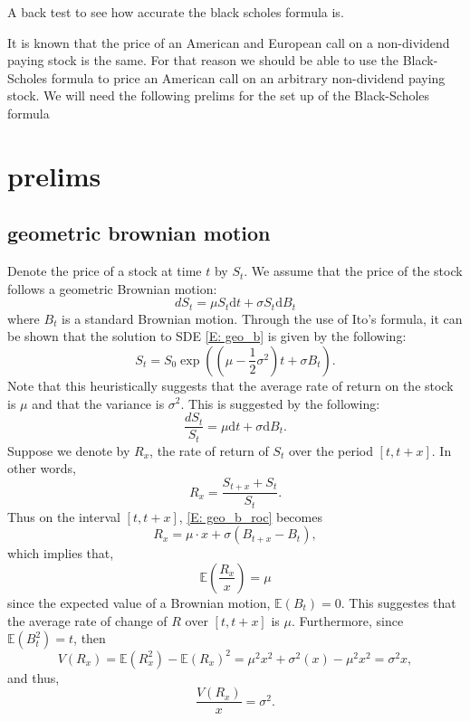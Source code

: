 \documentclass{article}
\numberwithin{equation}{section}
\newcommand{\ud}{\ensuremath{\mathrm{d}}}
\begin{document}
\begin{center}
	A back test to see how accurate the black scholes formula is.
\end{center}

It is known that the price of an American and European call on a non-dividend paying stock is the same. For that reason we should be able to use the Black-Scholes formula to price an American call on an arbitrary non-dividend paying stock. We will need the following prelims for the set up of the Black-Scholes formula 

\section{prelims}
\subsection{geometric brownian motion}
Denote the  price of a stock at time $t$ by $S_t$. We assume that the price of the stock follows a geometric Brownian motion:
	\begin{equation} \label{E: geo_b}
		dS_t = \mu S_t \ud t + \sigma S_t \ud B_t
	\end{equation}
where $B_t$ is a standard Brownian motion. Through the use of Ito's formula, it can be shown that the solution to SDE \eqref{E: geo_b} is given by the following:
	\begin{equation} \label{E: geo_b_sol}
		S_t = S_0 \exp\left( \left( \mu - \frac{1}{2}\sigma^2 \right)t + \sigma B_t \right).
	\end{equation} 
Note that this heuristically suggests that the average rate of return on the stock is $\mu$ and that the variance is $\sigma^2$. This is suggested by the following:
	\begin{equation} \label{E: geo_b_roc}
		\frac{dS_t}{S_t} = \mu \ud t + \sigma \ud B_t.
	\end{equation}
Suppose we denote by $R_x$, the rate of return of $S_t$ over the period $[t, t+x]$. In other words,
	\[
		R_x = \frac{S_{t+x} + S_t}{S_t}.
	\]
Thus on the interval $[t, t+x]$, \eqref{E: geo_b_roc} becomes 
	\begin{equation}
		R_x = \mu \cdot x + \sigma (B_{t + x} - B_t),
	\end{equation}
which implies that,
	\begin{equation}
		\mathbb{E}\left(\frac{R_x}{x}\right) = \mu
	\end{equation}
since the expected value of a Brownian motion, $\mathbb{E}(B_t) = 0$. This suggestes that the average rate of change of $R$ over $[t, t + x]$ is $\mu$. Furthermore, since $\mathbb{E}(B_t^2) = t$, then 
	\[
		V(R_x) = \mathbb{E}(R_x^2) - \mathbb{E}(R_x)^2 = \mu^2 x^2 + \sigma^2 (x) - \mu^2 x^2 = \sigma^2 x,
	\]
and thus,
	\[
		\frac{	V(R_x) }{x} = \sigma^2.
	\]
\end{document}
